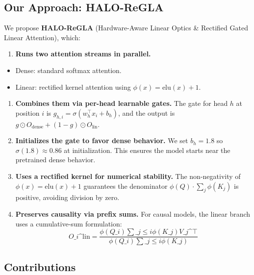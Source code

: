 \subsection{Our Approach: HALO-ReGLA}

We propose \textbf{HALO-ReGLA} (Hardware-Aware Linear Optics \& Rectified Gated 
Linear Attention), which:

\begin{enumerate}
\item \textbf{Runs two attention streams in parallel.}
\end{enumerate}
\begin{itemize}
\item Dense: standard softmax attention.
\item Linear: rectified kernel attention using $\phi(x) = \mathrm{elu}(x) + 1$.

\end{itemize}
\begin{enumerate}
\item \textbf{Combines them via per-head learnable gates.} The gate for head $h$ at
  position $i$ is $g_{h,i} = \sigma(w_h^\top x_i + b_h)$, and the output is
  $g \odot O_\text{dense} + (1 - g) \odot O_\text{lin}$.

\item \textbf{Initializes the gate to favor dense behavior.} We set $b_h = 1.8$ so
  $\sigma(1.8) \approx 0.86$ at initialization. This ensures the model
  starts near the pretrained dense behavior.

\item \textbf{Uses a rectified kernel for numerical stability.} The non-negativity of
  $\phi(x) = \mathrm{elu}(x) + 1$ guarantees the denominator
  $\phi(Q) \cdot \sum_j \phi(K_j)$ is positive, avoiding division by zero.

\item \textbf{Preserves causality via prefix sums.} For causal models, the linear
  branch uses a cumulative-sum formulation:
  $$
  O\_i\^{}\text{lin} = \frac{\phi(Q\_i) \sum\_{j \le i} \phi(K\_j) V\_j\^{}\top}{\phi(Q\_i) \sum\_{j \le i} \phi(K\_j)}
  $$

\end{enumerate}
\subsection{Contributions}

